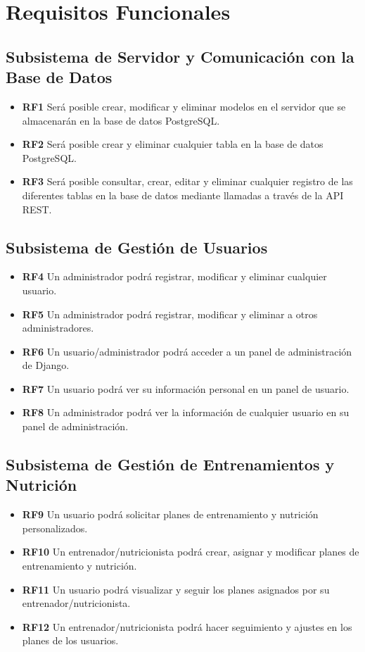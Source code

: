 \section{Requisitos Funcionales}

\subsection{Subsistema de Servidor y Comunicación con la Base de Datos}
\begin{itemize}
    \item \textbf{RF1} Será posible crear, modificar y eliminar modelos en el servidor que se almacenarán en la base de datos PostgreSQL.
    \item \textbf{RF2} Será posible crear y eliminar cualquier tabla en la base de datos PostgreSQL.
    \item \textbf{RF3} Será posible consultar, crear, editar y eliminar cualquier registro de las diferentes tablas en la base de datos mediante llamadas a través de la API REST.
\end{itemize}

\subsection{Subsistema de Gestión de Usuarios}
\begin{itemize}
    \item \textbf{RF4} Un administrador podrá registrar, modificar y eliminar cualquier usuario.
    \item \textbf{RF5} Un administrador podrá registrar, modificar y eliminar a otros administradores.
    \item \textbf{RF6} Un usuario/administrador podrá acceder a un panel de administración de Django.
    \item \textbf{RF7} Un usuario podrá ver su información personal en un panel de usuario.
    \item \textbf{RF8} Un administrador podrá ver la información de cualquier usuario en su panel de administración.
\end{itemize}

\subsection{Subsistema de Gestión de Entrenamientos y Nutrición}
\begin{itemize}
    \item \textbf{RF9} Un usuario podrá solicitar planes de entrenamiento y nutrición personalizados.
    \item \textbf{RF10} Un entrenador/nutricionista podrá crear, asignar y modificar planes de entrenamiento y nutrición.
    \item \textbf{RF11} Un usuario podrá visualizar y seguir los planes asignados por su entrenador/nutricionista.
    \item \textbf{RF12} Un entrenador/nutricionista podrá hacer seguimiento y ajustes en los planes de los usuarios.
\end{itemize}

